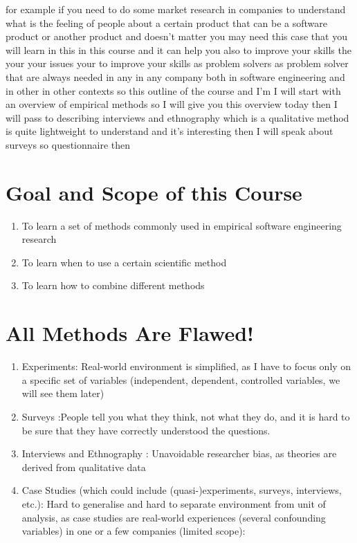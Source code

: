 \documentclass[conference, compsoc, twoside]{IEEEtran}
\begin{document}
for example if you need to do some market research in companies to understand what is the feeling of people about a certain product that can be a software product or another product and doesn't matter you may need this case that you will learn in this in this course and it can help you also to improve your skills the your your issues your to improve your skills as problem solvers as problem solver that are always needed in any in any company both in software engineering and in other in other contexts so this outline of the course and I'm I will start with an overview of empirical methods 
so I will give you this overview today then I will pass to describing interviews and ethnography which is a qualitative method is quite lightweight to understand and it's interesting then I will speak about surveys so questionnaire then 
\section{Goal and Scope of this Course}
    
\begin{enumerate}
\item To learn a set of methods commonly used in empirical software engineering research
\item To learn when to use a certain scientific method
\item To learn how to combine different methods
\end{enumerate}
\section{All Methods Are Flawed!}
\begin{enumerate}[label*=\arabic*.]
	\item Experiments: Real-world environment is simplified, as I have to focus only on a specific set of variables (independent, dependent, controlled variables, we will see them later)
	\item Surveys :People tell you what they think, not what they do, and it is hard to be sure that they have correctly understood the questions.
	\item Interviews and Ethnography : Unavoidable researcher bias, as theories are derived from qualitative data
	\item Case Studies (which could include (quasi-)experiments, surveys, interviews, etc.): Hard to generalise and hard to separate environment from unit of analysis, as case studies are real-world experiences (several confounding variables) in one or a few companies (limited scope):
\end{enumerate}
\end{document}
